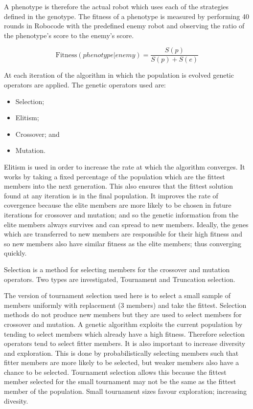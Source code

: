 A phenotype is therefore the actual robot which uses each of the strategies defined in the genotype. The fitness of a phenotype is measured by performing 40 rounds in Robocode with the predefined enemy robot and observing the ratio of the phenotype's score to the enemy's score.

\begin{equation}
\label{eqn:fitness}
\text{Fitness}\left({phenotype}|{enemy}\right) = 
\frac{S(p)}{S(p) + S(e)}
\end{equation}

At each iteration of the algorithm in which the population is evolved genetic operators are applied. The genetic operators used are:
\begin{itemize}
\item Selection;
\item Elitism;
\item Crossover; and 
\item Mutation.
\end{itemize}

Elitism is used in order to increase the rate at which the algorithm converges. It works by taking a fixed percentage of the population which are the fittest members into the next generation. This also ensures that the fittest solution found at any iteration is in the final population. It improves the rate of covergence because the elite members are more likely to be chosen in future iterations for crossover and mutation; and so the genetic information from the elite members always survives and can spread to new members. Ideally, the genes which are transferred to new members are responsible for their high fitness and so new members also have similar fitness as the elite members; thus converging quickly.

Selection is a method for selecting members for the crossover and mutation operators. Two types are investigated, Tournament and Truncation selection.

The version of tournament selection used here is to select a small sample of members uniformly with replacement (3 members) and take the fittest. Selection methods do not produce new members but they are used to select members for crossover and mutation. A genetic algorithm exploits the current population by tending to select members which already have a high fitness. Therefore selection operators tend to select fitter members. It is also important to increase diversity and exploration. This is done by probabilistically selecting members such that fitter members are more likely to be selected, but weaker members also have a chance to be selected. Tournament selection allows this because the fittest member selected for the small tournament may not be the same as the fittest member of the population. Small tournament sizes favour exploration; increasing divesity.

